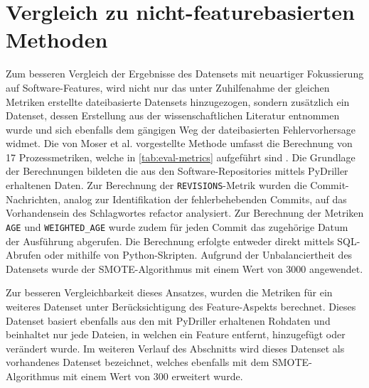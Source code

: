 \section{Vergleich zu nicht-featurebasierten Methoden}
\label{classic-eval}

Zum besseren Vergleich der Ergebnisse des Datensets mit neuartiger Fokussierung auf Software-Features, wird nicht nur das unter Zuhilfenahme der gleichen Metriken erstellte dateibasierte Datensets hinzugezogen, sondern zusätzlich ein Datenset, dessen Erstellung aus der wissenschaftlichen Literatur entnommen wurde und sich ebenfalls dem gängigen Weg der dateibasierten Fehlervorhersage widmet. Die von Moser et al. vorgestellte Methode umfasst die Berechnung von 17 Prozessmetriken, welche in \autoref{tab:eval-metrics} aufgeführt sind \cite{Moser2008}. Die Grundlage der Berechnungen bildeten die aus den Software-Repositories mittels PyDriller erhaltenen Daten. Zur Berechnung der \texttt{REVISIONS}-Metrik wurden die Commit-Nachrichten, analog zur Identifikation der fehlerbehebenden Commits, auf das Vorhandensein des Schlagwortes \glqq refactor\grqq{} analysiert. Zur Berechnung der Metriken \texttt{AGE} und \texttt{WEIGHTED\_AGE} wurde zudem für jeden Commit das zugehörige Datum der Ausführung abgerufen. Die Berechnung erfolgte entweder direkt mittels SQL-Abrufen oder mithilfe von Python-Skripten. Aufgrund der Unbalanciertheit des Datensets wurde der SMOTE-Algorithmus mit einem Wert von 3000 angewendet.

Zur besseren Vergleichbarkeit dieses Ansatzes, wurden die Metriken für ein weiteres Datenset unter Berücksichtigung des Feature-Aspekts berechnet. Dieses Datenset basiert ebenfalls aus den mit PyDriller erhaltenen Rohdaten und beinhaltet nur jede Dateien, in welchen ein Feature entfernt, hinzugefügt oder verändert wurde. Im weiteren Verlauf des Abschnitts wird dieses Datenset als \glqq vorhandenes Datenset\grqq{} bezeichnet, welches ebenfalls mit dem SMOTE-Algorithmus mit einem Wert von 300 erweitert wurde.

